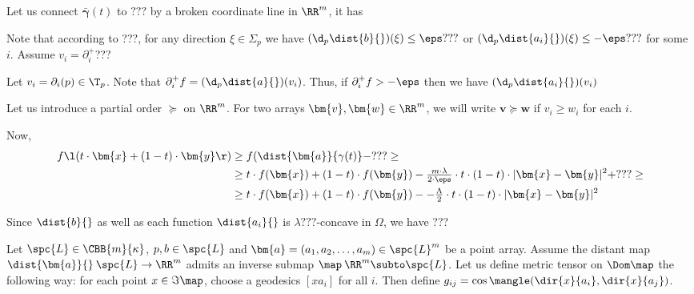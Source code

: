 {Let us connect $\bm{\bar\gamma}(t)$ to $???$ by a broken coordinate line in $\RR^m$,
it has 

Note that according to ???, for any direction $\xi\in\Sigma_p$ we have
$(\d_p\dist{b}{})(\xi)\le \eps???$
or $(\d_p\dist{a_i}{})(\xi)\le -\eps???$ for some $i$.
Assume $v_i=\partial^+_i$???

Let $v_i=\partial_i(p)\in \T_p$.
Note that $\partial_i^+f=(\d_p\dist{a}{})(v_i)$.
Thus, if $\partial_i^+f>-\eps$ then we have
$(\d_p\dist{a_i}{})(v_i)$

























Let us introduce a partial order $\succcurlyeq$ on $\RR^{m}$.
For two arrays 
$\bm{v}, \bm{w}\in \RR^{m}$, 
we will write
$\bm{v}\succcurlyeq\bm{w}$ if $v_i\ge w_i$ for each $i$.

Now,
\begin{align*}
 f\l(t\cdot\bm{x}+(1-t)\cdot\bm{y}\r)
&\ge
f(\dist{\bm{a}}{\gamma(t)}-???
\ge
\\
&\ge
t\cdot f(\bm{x})
+(1-t)\cdot f(\bm{y})
-\tfrac{m\cdot\lambda}{2\cdot\eps}\cdot t\cdot(1-t)\cdot|\bm{x}-\bm{y}|^2+???
\ge
\\
&\ge
t\cdot f(\bm{x})
+(1-t)\cdot f(\bm{y})-
-\tfrac\Lambda2\cdot t\cdot(1-t)\cdot|\bm{x}-\bm{y}|^2
\end{align*}


Since $\dist{b}{}$ 
as well as each function $\dist{a_i}{}$ is $\lambda???$-concave in $\Omega$,
we have ???
\qeds



















Let $\spc{L}\in\CBB{m}{\kappa}$,
$p,b\in\spc{L}$ 
and $\bm{a}=(a_1,a_2,\dots,a_m)\in\spc{L}^{m}$ be a point array.
Assume the distant map $\dist{\bm{a}}{}\:\spc{L}\to\RR^m$ admits an inverse submap $\map\:\RR^m\subto \spc{L}$.
Let us define metric tensor on $\Dom\map$ the following way:
for each point $x\in \Im\map$, choose a geodesics $[xa_i]$ for all $i$.
Then define $g_{ij}=\cos\mangle(\dir{x}{a_i},\dir{x}{a_j})$.

}
